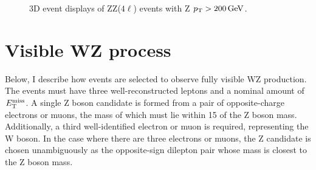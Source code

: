 \clearpage
\begin{figure}[!htb]
\centering
\setlength{\fboxsep}{0pt}
\setlength{\fboxrule}{0.3pt}
\vspace{1cm}

\vspace{1cm}

\caption{3D event displays of ZZ($4\ell$) events with Z $p_\mathrm{T} > 200 \,\text{Ge\hspace{-.08em}V}$. 
\eventDisplayCaption
\label{fig:zz4l_eventdisplay}}
\end{figure}
\clearpage


\section{Visible WZ process}
\label{sec:wz3l}
Below, I describe how events are selected to observe fully visible WZ production. 
The events must have three well-reconstructed leptons and a nominal amount of $E_\mathrm{T}^{\mathrm{miss}}$.
A single Z boson candidate is formed from a pair of opposite-charge electrons or muons, the mass of which must lie within 15 \GeV of the Z boson mass.
Additionally, a third well-identified electron or muon is required, representing the W boson.
In the case where there are three electrons or muons,
the Z candidate is chosen unambiguously as the opposite-sign dilepton pair whose mass is closest to the Z boson mass.

